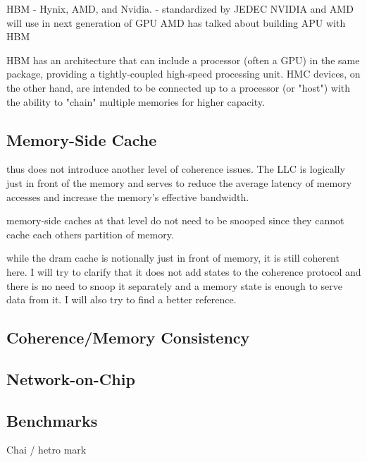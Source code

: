 HBM - Hynix, AMD, and Nvidia. - standardized by JEDEC
NVIDIA and AMD will use in next generation of GPU
AMD has talked about building APU with HBM

HBM has an architecture that can include a processor (often a GPU) in the same package, providing a tightly-coupled high-speed processing unit. HMC devices, on the other hand, are intended to be connected up to a processor (or "host") with the ability to "chain" multiple memories for higher capacity.
\subsection{Memory-Side Cache}
thus does not 
introduce another level of coherence issues. The LLC is logically just in front of the memory and serves 
to reduce the average latency of memory accesses and increase the memory’s effective bandwidth.

memory-side caches at that level do not need to be snooped since they cannot cache each others partition of memory.

while the dram cache is notionally just in front of memory, it is still coherent here. I will try to clarify that it does not add states to the coherence protocol and there is no need to snoop it separately and a memory state is enough to serve data from it. I will also try to find a better reference.
\subsection{Coherence/Memory Consistency}
\subsection{Network-on-Chip}
\subsection{Benchmarks}
Chai / hetro mark